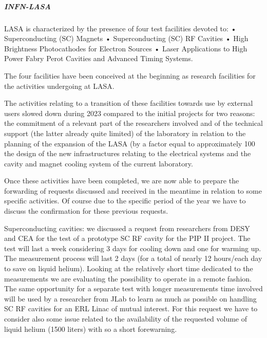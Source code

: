 

\subparagraph{INFN-LASA}


LASA is characterized by the presence of four test facilities devoted to:
•	Superconducting (SC) Magnets
•	Superconducting (SC) RF Cavities
•	High Brightness Photocathodes for Electron Sources
•	Laser Applications to High Power Fabry Perot Cavities and Advanced Timing Systems.

The four facilities have been conceived at the beginning as research facilities for the activities undergoing at LASA.

The activities relating to a transition of these facilities towards use by external users slowed down during 2023 compared to the initial projects for two reasons:
the commitment of a relevant part of the researchers involved and of the technical support (the latter already quite limited) of the laboratory in relation to the planning of the expansion of the LASA (by a factor equal to approximately 100%
the design of the new infrastructures relating to the electrical systems and the cavity and magnet cooling system of the current laboratory.

Once these activities have been completed, we are now able to prepare the forwarding of requests discussed and received in the meantime in relation to some specific activities.
Of course due to the specific period of the year we have to discuss the confirmation for these previous requests. 

Superconducting cavities: we discussed a request from researchers from DESY and CEA for the test of a prototype SC RF cavity for the PIP II project. The test will last a week considering 3 days for cooling down and one for warming up. The measurement process will last 2 days (for a total of nearly 12 hours/each day to save on liquid helium). Looking at the relatively short time dedicated to the measurements we are evaluating the possibility to operate in a remote fashion.
The same opportunity for a separate test with longer measurements time involved will be used by a researcher from JLab to learn as much as possible on handling SC RF cavities for an ERL Linac of mutual interest. For this request we have to consider also some issue related to the availability of the requested volume of liquid helium (1500 liters) with so a short forewarning.

